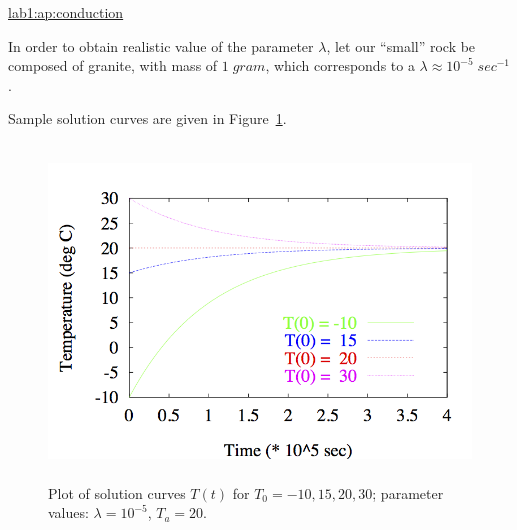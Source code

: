 \begin{example}
  \begin{mathnote} 
    \hyperref{Details of the derivation \dots}{See Appendix }{ for a
      derivation of the solution.}{lab1:ap:conduction}
  \end{mathnote}
  
  In order to obtain realistic value of the parameter $\lambda$,
  let our ``small'' rock be composed of granite, with mass of
  $1\;gram$, which corresponds to a   
  $\lambda \approx 10^{-5}\;sec^{-1}$.  

%
% 
\begin{latexonly}
    Sample solution curves are given in Figure~\ref{lab1:fig:conduction}.
    \begin{figure}[htbp]
      \begin{center}
        \leavevmode
        \includegraphics[height=3.5in]{conduction/conduction}
        \caption{Plot of solution curves $T(t)$ for $T_0=-10,15,20,30$;
          parameter values: $\lambda=10^{-5}$, $T_a=20$.} 
        \label{lab1:fig:conduction}
      \end{center}
    \end{figure}
\end{latexonly}



\end{example}

